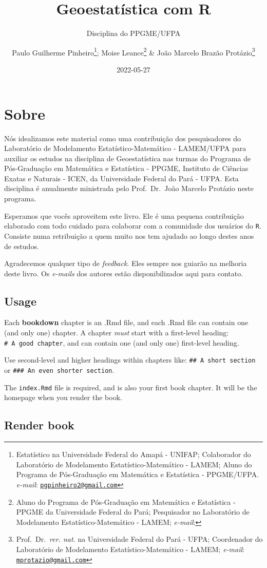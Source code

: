 \documentclass[
]{book}
\title{Geoestatística com R}
\subtitle{Disciplina do PPGME/UFPA}
\author{Paulo Guilherme Pinheiro\footnote{Estatístico na Universidade Federal do Amapá - UNIFAP; Colaborador do Laboratório de Modelamento Estatístico-Matemático - LAMEM; Aluno do Programa de Pós-Graduação em Matemática e Estatística - PPGME/UFPA. \emph{e-mail}: \href{mailto:pgpinheiro2@gmail.com}{\nolinkurl{pgpinheiro2@gmail.com}}}; Moise Leance\footnote{Aluno do Programa de Pós-Graduação em Matemática e Estatística - PPGME da Universidade Federal do Pará; Pesquisador no Laboratório de Modelamento Estatístico-Matemático - LAMEM; \emph{e-mail}:} \& João Marcelo Brazão Protázio\footnote{Prof.~Dr.~\emph{rer. nat.} na Universidade Federal do Pará - UFPA; Coordenador do Laboratório de Modelamento Estatístico-Matemático - LAMEM; \emph{e-mail}: \href{mailto:mprotazio@gmail.com}{\nolinkurl{mprotazio@gmail.com}}}}
\date{2022-05-27}
\theoremstyle{definition}
\theoremstyle{definition}
\theoremstyle{definition}
\theoremstyle{definition}
\theoremstyle{remark}
\begin{document}
\maketitle

{
\setcounter{tocdepth}{1}
\tableofcontents
}
\hypertarget{sobre}{%
\chapter*{Sobre}\label{sobre}}

Nós idealizamos este material como uma contribuição dos pesquisadores do Laboratório de Modelamento Estatístico-Matemático - LAMEM/UFPA para auxiliar os estudos na disciplina de Geoestatística nas turmas do Programa de Pós-Graduação em Matemática e Estatística - PPGME, Instituto de Ciências Exatas e Naturais - ICEN, da Universidade Federal do Pará - UFPA. Esta disciplina é anualmente ministrada pelo Prof.~Dr.~João Marcelo Protázio neste programa.

Esperamos que vocês aproveitem este livro. Ele é uma pequena contribuição elaborado com todo cuidado para colaborar com a comunidade dos usuários do \texttt{R}. Consiste numa retribuição a quem muito nos tem ajudado ao longo destes anos de estudos.

Agradecemos qualquer tipo de \emph{feedback}. Eles sempre nos guiarão na melhoria deste livro. Os \emph{e-mails} dos autores estão disponibilizados aqui para contato.

\hypertarget{usage}{%
\section{Usage}\label{usage}}

Each \textbf{bookdown} chapter is an .Rmd file, and each .Rmd file can contain one (and only one) chapter. A chapter \emph{must} start with a first-level heading: \texttt{\#\ A\ good\ chapter}, and can contain one (and only one) first-level heading.

Use second-level and higher headings within chapters like: \texttt{\#\#\ A\ short\ section} or \texttt{\#\#\#\ An\ even\ shorter\ section}.

The \texttt{index.Rmd} file is required, and is also your first book chapter. It will be the homepage when you render the book.

\hypertarget{render-book}{%
\section{Render book}\label{render-book}}
\end{document}
